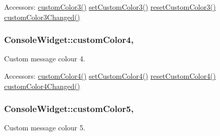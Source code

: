 \begin{DoxyParagraph}{Accessors\-:}
\hyperlink{class_console_widget_a503ef241a14e2e2990e254bc3e406d66}{custom\-Color3()} \hyperlink{class_console_widget_aed0c8abe6d9b92aef97266e2b93b347f}{set\-Custom\-Color3()} \hyperlink{class_console_widget_acdb81d6a8a21fcb15ebbf3c0cefcd434}{reset\-Custom\-Color3()} \hyperlink{class_console_widget_a0eece2c8ac4de3639931b76e82c08196}{custom\-Color3\-Changed()} 
\end{DoxyParagraph}
\hypertarget{class_console_widget_aa0a5471af07f6a8601cef118d12aea10}{
\subsubsection[{custom\-Color4}]{\setlength{\rightskip}{0pt plus 5cm}Console\-Widget\-::custom\-Color4\hspace{0.3cm}{\ttfamily [read]}, {\ttfamily [write]}}}\label{class_console_widget_aa0a5471af07f6a8601cef118d12aea10}


Custom message colour 4. 

\begin{DoxyParagraph}{Accessors\-:}
\hyperlink{class_console_widget_aa0a5471af07f6a8601cef118d12aea10}{custom\-Color4()} \hyperlink{class_console_widget_ae10358d0184634959dd97e65e19bd9ef}{set\-Custom\-Color4()} \hyperlink{class_console_widget_ac955271b9857a7f7e1a23d25a6c9082d}{reset\-Custom\-Color4()} \hyperlink{class_console_widget_a655f6522aa4bbfc625c3d6f9ffbfe26e}{custom\-Color4\-Changed()} 
\end{DoxyParagraph}
\hypertarget{class_console_widget_ae5df9bbf98d2604e2ce96940910cfd8a}{
\subsubsection[{custom\-Color5}]{\setlength{\rightskip}{0pt plus 5cm}Console\-Widget\-::custom\-Color5\hspace{0.3cm}{\ttfamily [read]}, {\ttfamily [write]}}}\label{class_console_widget_ae5df9bbf98d2604e2ce96940910cfd8a}


Custom message colour 5. 

